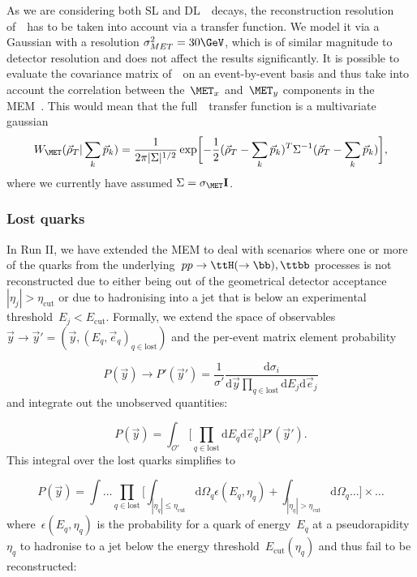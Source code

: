 As we are considering both SL and DL~\ttH~decays, the reconstruction resolution of~\MET~has to be taken into account via a transfer function. We model it via a Gaussian with a resolution $\sigma_{MET}^2 = 30\GeV$, which is of similar magnitude to detector resolution and does not affect the results significantly.
It is possible to evaluate the covariance matrix of~\MET~on an event-by-event basis and thus take into account the correlation between the~$\MET_x$ and~$\MET_y$ components in the MEM~\cite{cms_htautau}. This would mean that the full~\MET~transfer function is a multivariate gaussian
\begin{equation}
W_{\MET}(\vec{\rho}_T | \sum_k \vec{p}_k) = \frac{1}{2\pi |\Sigma|^{1/2}} \exp \biggl[ -\frac{1}{2} (\vec{\rho}_T - \sum_k \vec{p}_k)^T \Sigma^{-1} (\vec{\rho}_T - \sum_k \vec{p}_k)\biggr],
\end{equation}
where we currently have assumed $\Sigma = \sigma_{\MET} \mathbf{I}$.

\subsubsection{Lost quarks}
\label{sec:lost_quarks}

In Run II, we have extended the MEM to deal with scenarios where one or more of the quarks from the underlying~$pp \rightarrow \ttH(\rightarrow \bb),\ttbb$ processes is not reconstructed due to either being out of the geometrical detector acceptance~$|\eta_j| > \eta_{\mathrm{cut}}$ or due to hadronising into a jet that is below an experimental threshold~$E_j < E_{\mathrm{cut}}$.
Formally, we extend the space of observables~$\vec{y} \rightarrow \vec{y}' = (\vec{y}, (E_q, \vec{e}_q)_{q \in \mathrm{lost}})$ and the per-event matrix element probability

\begin{equation}
P(\vec{y}) \rightarrow P'(\vec{y}') = \frac{1}{\sigma'} \frac{\mathrm{d} \sigma_i}{\mathrm{d}\vec{y} \prod_{q\in\mathrm{lost}} \mathrm{d}E_j \mathrm{d}\vec{e}_j}
\end{equation}
and integrate out the unobserved quantities:

\begin{equation}
P(\vec{y}) = \int_{\mathcal{O}'} \bigl[ \prod_{q \in \mathrm{lost}} \mathrm{d}E_q \mathrm{d}\vec{e}_q \bigr] P'(\vec{y}').
\end{equation}
This integral over the lost quarks simplifies to

\begin{equation}
P(\vec{y}) = \int \dots \prod_{q\in\mathrm{lost}} \biggl[ \int_{|\eta_q| \leq \eta_{\mathrm{cut}}} \mathrm{d}\Omega_q \epsilon(E_q, \eta_q) + \int_{|\eta_q| > \eta_{\mathrm{cut}}} \mathrm{d}\Omega_q \dots \biggr] \times \dots
\end{equation}
where~$\epsilon(E_q, \eta_q)$ is the probability for a quark of energy~$E_q$ at a pseudorapidity~$\eta_q$ to hadronise to a jet below the energy threshold~$E_{\mathrm{cut}}(\eta_q)$ and thus fail to be reconstructed:

